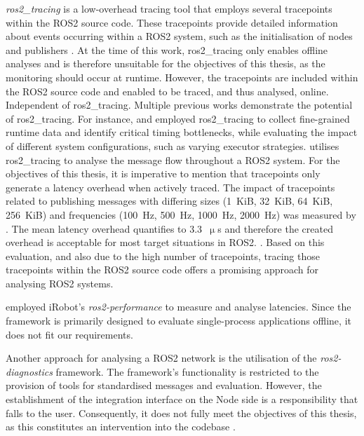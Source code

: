 \emph{ros2\_tracing} \cite{ros2_tracing} is a low-overhead tracing tool that employs several tracepoints within the ROS2 source code. These tracepoints provide detailed information about events occurring within a ROS2 system, such as the initialisation of nodes and publishers \cite{github:ros2_tracing}. 
At the time of this work, ros2\_tracing only enables offline analyses and is therefore unsuitable for the objectives of this thesis, as the monitoring should occur at runtime. However, the tracepoints are included within the ROS2 source code and enabled to be traced, and thus analysed, online. Independent of ros2\_tracing.\newline
Multiple previous works demonstrate the potential of ros2\_tracing. For instance, \Textcite{howFastIsMySoftware} and \Textcite{multiExecutor} employed ros2\_tracing to collect fine-grained runtime data and identify critical timing bottlenecks, while evaluating the impact of different system configurations, such as varying executor strategies. \Textcite{ros2_tracing:msgFlowAnalysis} utilises ros2\_tracing to analyse the message flow throughout a ROS2 system.\newline
For the objectives of this thesis, it is imperative to mention that tracepoints only generate a latency overhead when actively traced. The impact of tracepoints related to publishing messages with differing sizes (1~KiB, 32~KiB, 64~KiB, 256~KiB) and frequencies (100~Hz, 500~Hz, 1000~Hz, 2000~Hz) was measured by \Textcite[p.~6516f]{ros2_tracing}. The mean latency overhead quantifies to 3.3~$\upmu$s and therefore the created overhead \glqq{}is acceptable for most target situations in ROS2.\grqq{} \cite[p.~6516f]{ros2_tracing}. Based on this evaluation, and also due to the high number of tracepoints, tracing those tracepoints within the ROS2 source code offers a promising approach for analysing ROS2 systems.

\Textcite{ROS2exploringPerformance} employed iRobot's \emph{ros2-performance} \cite{github:ros2_performance} to measure and analyse latencies. Since the framework is primarily designed to evaluate single-process applications offline, it does not fit our requirements.

Another approach for analysing a ROS2 network is the utilisation of the \emph{ros2-diagnostics} framework. The framework's functionality is restricted to the provision of tools for standardised messages and evaluation. However, the establishment of the integration interface on the Node side is a responsibility that falls to the user. Consequently, it does not fully meet the objectives of this thesis, as this constitutes an intervention into the codebase \cite{github:ros_diagnostics}.


